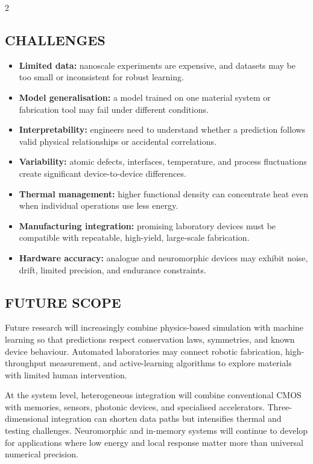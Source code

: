 \begin{multicols}{2}
  \subsection*{\centering\uppercase{Challenges}}
  \begin{itemize}\justifying
    \item \textbf{Limited data:} nanoscale experiments are expensive, and datasets may be too small or inconsistent for robust learning.
    \item \textbf{Model generalisation:} a model trained on one material system or fabrication tool may fail under different conditions.
    \item \textbf{Interpretability:} engineers need to understand whether a prediction follows valid physical relationships or accidental correlations.
    \item \textbf{Variability:} atomic defects, interfaces, temperature, and process fluctuations create significant device-to-device differences.
    \item \textbf{Thermal management:} higher functional density can concentrate heat even when individual operations use less energy.
    \item \textbf{Manufacturing integration:} promising laboratory devices must be compatible with repeatable, high-yield, large-scale fabrication.
    \item \textbf{Hardware accuracy:} analogue and neuromorphic devices may exhibit noise, drift, limited precision, and endurance constraints.
  \end{itemize}

  \subsection*{\centering\uppercase{Future Scope}}
  Future research will increasingly combine physics-based simulation with machine learning so that predictions respect conservation laws, symmetries, and known device behaviour. Automated laboratories may connect robotic fabrication, high-throughput measurement, and active-learning algorithms to explore materials with limited human intervention.

  \noindent
  At the system level, heterogeneous integration will combine conventional CMOS with memories, sensors, photonic devices, and specialised accelerators. Three-dimensional integration can shorten data paths but intensifies thermal and testing challenges. Neuromorphic and in-memory systems will continue to develop for applications where low energy and local response matter more than universal numerical precision.


\end{multicols}
